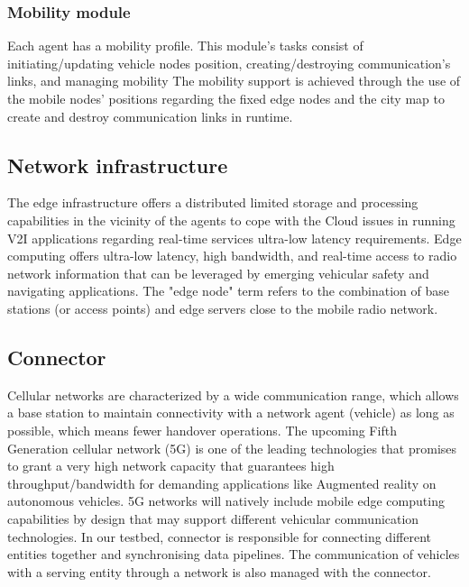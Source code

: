 \documentclass[conference]{IEEEtran}
\begin{document}
\subsubsection{Mobility module}
\par Each agent has a mobility profile. This module's tasks consist of initiating/updating vehicle nodes position, creating/destroying communication's links, and managing mobility
The mobility support is achieved through the use of the mobile nodes’ positions regarding the fixed edge nodes and the city map to create and destroy communication links in runtime.
\subsection{Network infrastructure}
\par The edge infrastructure offers a distributed limited storage and processing capabilities in the vicinity of the agents to cope with the Cloud issues in running V2I applications regarding real-time services ultra-low latency requirements.
Edge computing offers ultra-low latency, high bandwidth, and real-time access to radio network information that can be leveraged by emerging vehicular safety and navigating applications. The "edge node" term refers to the combination of base stations (or access points) and edge servers close to the mobile radio network. 
 \subsection{Connector} 
\par Cellular networks are characterized by a wide communication range, which allows a base station to maintain connectivity with a network agent (vehicle) as long as possible, which means fewer handover operations. The upcoming Fifth Generation cellular network (5G) is one of the leading technologies that promises to grant a very high network capacity that guarantees high throughput/bandwidth for demanding applications like Augmented reality on autonomous vehicles. 5G networks will natively include mobile edge computing capabilities by design that may support different vehicular communication technologies. In our testbed, connector is responsible for connecting different entities together and synchronising data pipelines. The communication of vehicles with a serving entity through a network is also managed with the connector.
\end{document}
